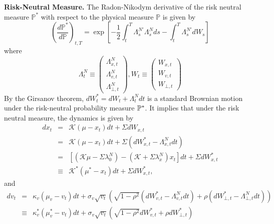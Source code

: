 \documentclass{article}
\begin{document}
\textbf{Risk-Neutral Measure.} The Radon-Nikodym derivative of the risk
neutral measure $\mathbb{P}^{\ast }$ with respect to the physical measure $%
\mathbb{P}$ is given by%
\begin{equation}
\left( \frac{d\mathbb{P}^{\ast }}{d\mathbb{P}}\right) _{t,T}=\exp \left[ -%
\frac{1}{2}\int_{t}^{T}\Lambda _{s}^{N\prime }\Lambda
_{s}^{N}ds-\int_{t}^{T}\Lambda _{s}^{N\prime }dW_{s}\right] 
\end{equation}%
where 
\begin{equation*}
\Lambda _{t}^{N}\equiv \left( 
\begin{array}{c}
\Lambda _{x,t}^{N} \\ 
\Lambda _{v,t}^{N} \\ 
\Lambda _{\bot ,t}^{N}%
\end{array}%
\right) ,W_{t}\equiv \left( 
\begin{array}{c}
W_{x,t} \\ 
W_{v,t} \\ 
W_{\bot ,t}%
\end{array}%
\right) 
\end{equation*}%
By the Girsanov theorem, $dW_{t}^{\ast }=dW_{t}+\Lambda _{t}^{N}dt$ is a
standard Brownian motion under the risk-neutral probability measure $\mathbb{%
P}^{\ast }$. It implies that under the risk neutral measure, the dynamics is
given by%
\begin{eqnarray*}
dx_{t} &=&\mathcal{K}\left( \mu -x_{t}\right) dt+\Sigma dW_{x,t} \\
&=&\mathcal{K}\left( \mu -x_{t}\right) dt+\Sigma \left( dW_{x,t}^{\ast
}-\Lambda _{x,t}^{N}dt\right)  \\
&=&\left[ \left( \mathcal{K}\mu -\Sigma \lambda _{0}^{N}\right) -\left( 
\mathcal{K}+\Sigma \lambda _{x}^{N}\right) x_{t}\right] dt+\Sigma
dW_{x,t}^{\ast } \\
&\equiv &\mathcal{K}^{\ast }\left( \mu ^{\ast }-x_{t}\right) dt+\Sigma
dW_{x,t}^{\ast },
\end{eqnarray*}%
and%
\begin{eqnarray*}
dv_{t} &=&\kappa _{v}\left( \mu _{v}-v_{t}\right) dt+\sigma _{v}\sqrt{v_{t}}%
\left( \sqrt{1-\rho ^{2}}\left( dW_{v,t}^{\ast }-\Lambda _{v,t}^{N}dt\right)
+\rho \left( dW_{\bot ,t}^{\ast }-\Lambda _{\bot ,t}^{N}dt\right) \right) 
\text{ \ \ \ } \\
&\equiv &\kappa _{v}^{\ast }\left( \mu _{v}^{\ast }-v_{t}\right) dt+\sigma
_{v}\sqrt{v_{t}}\left( \sqrt{1-\rho ^{2}}dW_{v,t}^{\ast }+\rho dW_{\bot
,t}^{\ast }\right) 
\end{eqnarray*}%
\end{document}
